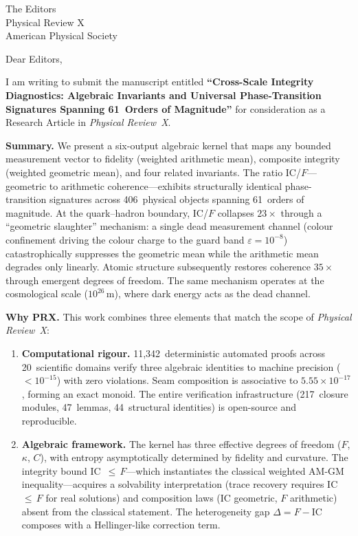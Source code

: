 \documentclass[11pt]{letter}
\begin{document}
\begin{letter}{The Editors\\Physical Review X\\American Physical Society}

\opening{Dear Editors,}

I am writing to submit the manuscript entitled \textbf{``Cross-Scale
Integrity Diagnostics: Algebraic Invariants and Universal
Phase-Transition Signatures Spanning 61~Orders of Magnitude''} for
consideration as a Research Article in \emph{Physical Review~X}.

\textbf{Summary.} We present a six-output algebraic kernel that maps
any bounded measurement vector to fidelity (weighted arithmetic
mean), composite integrity (weighted geometric mean), and four
related invariants. The ratio IC/$F$---geometric to arithmetic
coherence---exhibits structurally identical phase-transition
signatures across 406~physical objects spanning 61~orders of
magnitude. At the quark--hadron boundary, IC/$F$ collapses
$23\times$ through a ``geometric slaughter'' mechanism: a single
dead measurement channel (colour confinement driving the colour
charge to the guard band $\varepsilon = 10^{-8}$) catastrophically
suppresses the geometric mean while the arithmetic mean degrades
only linearly. Atomic structure subsequently restores coherence
$35\times$ through emergent degrees of freedom. The same mechanism
operates at the cosmological scale ($10^{26}$\,m), where dark
energy acts as the dead channel.

\textbf{Why PRX.} This work combines three elements that match
the scope of \emph{Physical Review~X}:

\begin{enumerate}
\item \textbf{Computational rigour.} 11,342~deterministic automated
  proofs across 20~scientific domains verify three algebraic
  identities to machine precision ($<10^{-15}$) with zero
  violations. Seam composition is associative to $5.55 \times
  10^{-17}$, forming an exact monoid. The entire verification
  infrastructure (217~closure modules, 47~lemmas, 44~structural
  identities) is open-source and reproducible.

\item \textbf{Algebraic framework.} The kernel has three effective
  degrees of freedom ($F$, $\kappa$, $C$), with entropy
  asymptotically determined by fidelity and curvature. The integrity
  bound IC~$\leq\,F$---which instantiates the classical weighted
  AM-GM inequality---acquires a solvability interpretation
  (trace recovery requires IC~$\leq\,F$ for real solutions) and
  composition laws (IC geometric, $F$ arithmetic) absent from
  the classical statement. The heterogeneity gap
  $\Delta = F - \text{IC}$ composes with a Hellinger-like
  correction term.


\end{enumerate}
\end{letter}
\end{document}
